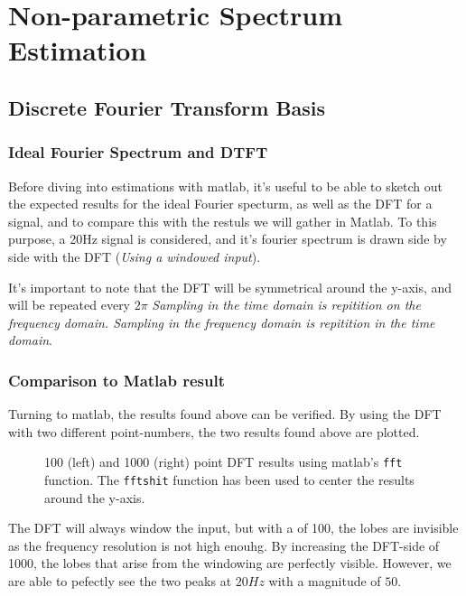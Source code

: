 \documentclass[main.tex]{subfiles}
\begin{document}
\section{Non-parametric Spectrum Estimation}


\subsection{Discrete Fourier Transform Basis}

\subsubsection{Ideal Fourier Spectrum and DTFT}

Before diving into estimations with matlab, it's useful to be able to sketch out the expected results for the ideal Fourier specturm, as well as the DFT for a signal, and to compare this with the restuls we will gather in Matlab. To this purpose, a 20Hz signal is considered, and it's fourier spectrum is drawn side by side with the DFT (\textit{Using a windowed input}).


It's important to note that the DFT will be symmetrical around the y-axis, and will be repeated every $2\pi$ \textit{Sampling in the time domain is repitition on the frequency domain. Sampling in the frequency domain is repitition in the time domain}.


\subsubsection{Comparison to Matlab result}

Turning to matlab, the results found above can be verified. By using the DFT with two different point-numbers, the two results found above are plotted.

\begin{figure}[H]
	\centering 
	\resizebox{0.8\textwidth}{!}{}
	\caption{100 (left) and 1000 (right) point DFT results using matlab's {\tt fft} function. The {\tt fftshit} function has been used to center the results around the y-axis.}
	\label{fig:q1_1_b}
\end{figure}

The DFT will always window the input, but with a of 100, the lobes are invisible as the frequency resolution is not high enouhg. By increasing the DFT-side of 1000, the lobes that arise from the windowing are perfectly visible. However, we are able to pefectly see the two peaks at $20Hz$ with a magnitude of $50$.
\end{document}
